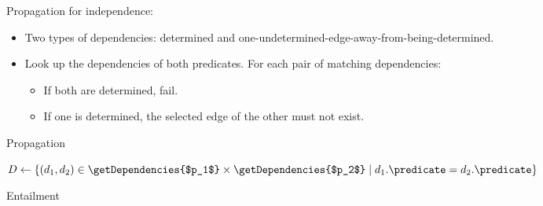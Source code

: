\documentclass[runningheads]{llncs}
\begin{document}
Propagation for independence:
\begin{itemize}
\item Two types of dependencies: determined and
  one-undetermined-edge-away-from-being-determined.
\item Look up the dependencies of both predicates. For each pair of
  matching dependencies:
  \begin{itemize}
  \item If both are determined, fail.
  \item If one is determined, the selected edge of the other must not
    exist.
  \end{itemize}
\end{itemize}

\begin{algorithm}
  \caption{Propagation}
\end{algorithm}

\begin{algorithm}
  $D \gets \{ (d_1, d_2) \in \getDependencies{$p_1$} \times
  \getDependencies{$p_2$} \mid d_1.\predicate = d_2.\predicate \}$\;
  \;
  \caption{Entailment}
\end{algorithm}
\end{document}
